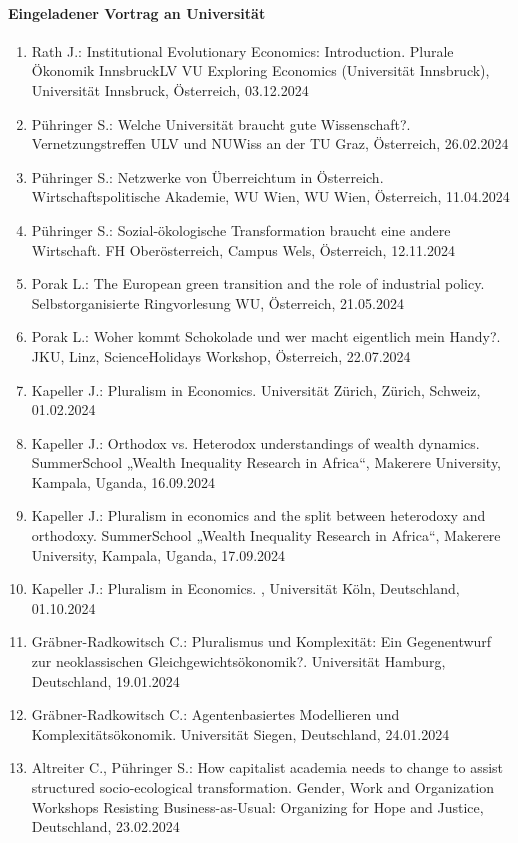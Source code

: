 \paragraph{Eingeladener Vortrag an Universität}
\begin{enumerate}
	\item Rath J.: Institutional Evolutionary Economics: Introduction. Plurale Ökonomik InnsbruckLV VU Exploring Economics (Universität Innsbruck), Universität Innsbruck, Österreich, 03.12.2024
	\item Pühringer S.: Welche Universität braucht gute Wissenschaft?. Vernetzungstreffen ULV und NUWiss an der TU Graz, Österreich, 26.02.2024
	\item Pühringer S.: Netzwerke von Überreichtum in Österreich. Wirtschaftspolitische Akademie, WU Wien, WU Wien, Österreich, 11.04.2024
	\item Pühringer S.: Sozial-ökologische Transformation braucht eine andere Wirtschaft. FH Oberösterreich, Campus Wels, Österreich, 12.11.2024
	\item Porak L.: The European green transition and the role of industrial policy. Selbstorganisierte Ringvorlesung WU, Österreich, 21.05.2024
	\item Porak L.: Woher kommt Schokolade und wer macht eigentlich mein Handy?. JKU, Linz, ScienceHolidays Workshop, Österreich, 22.07.2024
	\item Kapeller J.: Pluralism in Economics. Universität Zürich, Zürich, Schweiz, 01.02.2024
	\item Kapeller J.: Orthodox vs. Heterodox understandings of wealth dynamics. SummerSchool „Wealth Inequality Research in  Africa“, Makerere University, Kampala, Uganda, 16.09.2024
	\item Kapeller J.: Pluralism in economics and the split between heterodoxy and orthodoxy. SummerSchool „Wealth Inequality Research in  Africa“, Makerere University, Kampala, Uganda, 17.09.2024
	\item Kapeller J.: Pluralism in Economics. , Universität Köln, Deutschland, 01.10.2024
	\item Gräbner-Radkowitsch C.: Pluralismus und Komplexität: Ein Gegenentwurf zur neoklassischen Gleichgewichtsökonomik?. Universität Hamburg, Deutschland, 19.01.2024
	\item Gräbner-Radkowitsch C.: Agentenbasiertes Modellieren und Komplexitätsökonomik. Universität Siegen, Deutschland, 24.01.2024
	\item Altreiter C., Pühringer S.: How capitalist academia needs to change to assist structured socio-ecological transformation. Gender, Work and Organization Workshops Resisting Business-as-Usual: Organizing for Hope and Justice, Deutschland, 23.02.2024
\end{enumerate}
